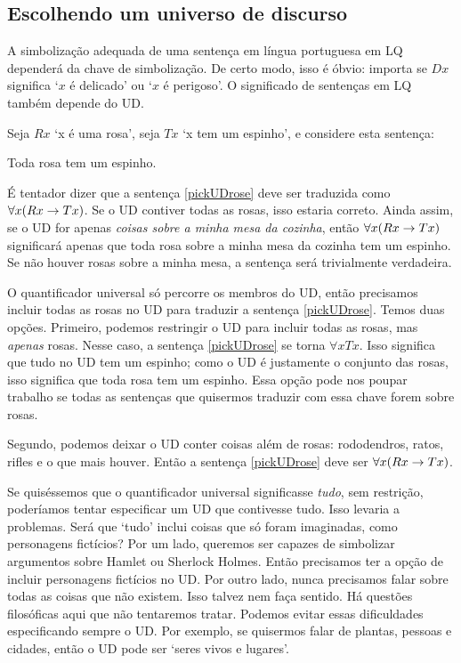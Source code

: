 \subsection{Escolhendo um universo de discurso}
A simbolização adequada de uma sentença em língua portuguesa em LQ dependerá da chave de simbolização. De certo modo, isso é óbvio: importa se $Dx$ significa `$x$ é delicado' ou `$x$ é perigoso'. O significado de sentenças em LQ também depende do UD.

Seja $Rx$ `x é uma rosa', seja $Tx$ `x tem um espinho', e considere esta sentença:
\begin{earg}
\item[\ex{pickUDrose}] Toda rosa tem um espinho.
\end{earg}

É tentador dizer que a sentença \ref{pickUDrose} deve ser traduzida como $\forall x(Rx \rightarrow Tx)$. Se o UD contiver todas as rosas, isso estaria correto. Ainda assim, se o UD for apenas \emph{coisas sobre a minha mesa da cozinha}, então $\forall x(Rx \rightarrow Tx)$ significará apenas que toda rosa sobre a minha mesa da cozinha tem um espinho. Se não houver rosas sobre a minha mesa, a sentença será trivialmente verdadeira.

O quantificador universal só percorre os membros do UD, então precisamos incluir todas as rosas no UD para traduzir a sentença \ref{pickUDrose}. Temos duas opções. Primeiro, podemos restringir o UD para incluir todas as rosas, mas \emph{apenas} rosas. Nesse caso, a sentença \ref{pickUDrose} se torna $\forall x Tx$. Isso significa que tudo no UD tem um espinho; como o UD é justamente o conjunto das rosas, isso significa que toda rosa tem um espinho. Essa opção pode nos poupar trabalho se todas as sentenças que quisermos traduzir com essa chave forem sobre rosas.

Segundo, podemos deixar o UD conter coisas além de rosas: rododendros, ratos, rifles e o que mais houver. Então a sentença \ref{pickUDrose} deve ser $\forall x(Rx \rightarrow Tx)$.

Se quiséssemos que o quantificador universal significasse \emph{tudo}, sem restrição, poderíamos tentar especificar um UD que contivesse tudo. Isso levaria a problemas. Será que `tudo' inclui coisas que só foram imaginadas, como personagens fictícios? Por um lado, queremos ser capazes de simbolizar argumentos sobre Hamlet ou Sherlock Holmes. Então precisamos ter a opção de incluir personagens fictícios no UD. Por outro lado, nunca precisamos falar sobre todas as coisas que não existem. Isso talvez nem faça sentido. Há questões filosóficas aqui que não tentaremos tratar. Podemos evitar essas dificuldades especificando sempre o UD. Por exemplo, se quisermos falar de plantas, pessoas e cidades, então o UD pode ser `seres vivos e lugares'.

